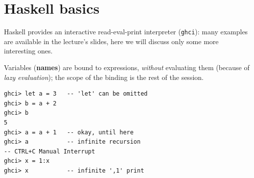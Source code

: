 \section{Haskell basics}
\begin{paracol}{2}
\vspace{\fill}
\switchcolumn
\vspace{\fill}
\vspace{\fill}
\end{paracol}

Haskell provides an interactive  read-eval-print interpreter (\texttt{ghci}):
many examples are available in the lecture's slides,
here we will discuss only some more interesting ones.

Variables (\textbf{names}) are bound to expressions,
\textit{without }evaluating them (because of \textit{lazy
evaluation}); 
the scope of the binding is the rest of the session.
\lstset{language=Haskell}

\begin{lstlisting}
ghci> let a = 3   -- 'let' can be omitted
ghci> b = a + 2
ghci> b
5
ghci> a = a + 1   -- okay, until here
ghci> a           -- infinite recursion
-- CTRL+C Manual Interrupt
ghci> x = 1:x 
ghci> x           -- infinite ',1' print
\end{lstlisting}


